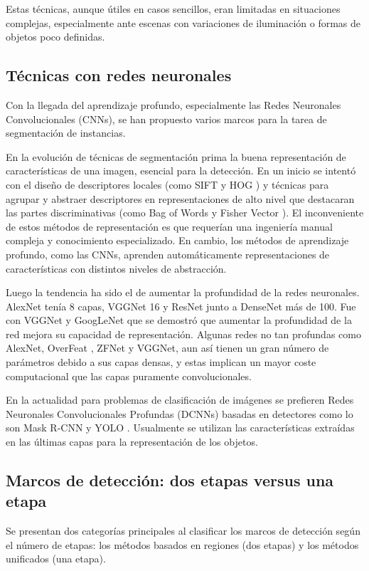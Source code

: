 Estas técnicas, aunque útiles en casos sencillos, eran limitadas en situaciones complejas, especialmente ante escenas con variaciones de iluminación o formas de objetos poco definidas.

\subsection{Técnicas con redes neuronales}
Con la llegada del aprendizaje profundo, especialmente las Redes Neuronales Convolucionales (CNNs), se han propuesto varios marcos para la tarea de segmentación de instancias.

En la evolución de técnicas de segmentación prima la buena representación de características de una imagen, esencial para la detección. En un inicio se intentó con el diseño de descriptores locales (como SIFT \cite{SIFT} y HOG \cite{HOG}) y técnicas para agrupar y abstraer descriptores en representaciones de alto nivel que destacaran las partes discriminativas (como Bag of Words \cite{BagOfWords} y Fisher Vector \cite{FisherVector}). El inconveniente de estos métodos de representación es que requerían una ingeniería manual compleja y conocimiento especializado. En cambio, los métodos de aprendizaje profundo, como las CNNs, aprenden automáticamente representaciones de características con distintos niveles de abstracción.

Luego la tendencia ha sido el de aumentar la profundidad de la redes neuronales. AlexNet \cite{AlexNet} tenía 8 capas, VGGNet \cite{VGGNet} 16 y ResNet \cite{ResNet} junto a DenseNet \cite{DenseNet} más de 100. Fue con VGGNet y GoogLeNet \cite{GoogleNet} que se demostró que aumentar la profundidad de la red mejora su capacidad de representación. Algunas redes no tan profundas como AlexNet, OverFeat \cite{OverFeat}, ZFNet \cite{ZFNet} y VGGNet, aun así tienen un gran número de parámetros debido a sus capas densas, y estas implican un mayor coste computacional que las capas puramente convolucionales.

En la actualidad para problemas de clasificación de imágenes se prefieren Redes Neuronales Convolucionales Profundas (DCNNs) basadas en detectores como lo son Mask R-CNN \cite{MaskRCNN} y YOLO \cite{YOLO}. Usualmente se utilizan las características extraídas en las últimas capas para la representación de los objetos.

\subsection{Marcos de detección: dos etapas versus una etapa}
\label{sec:anexo_marcos}
Se presentan dos categorías principales al clasificar los marcos de detección según el número de etapas: los métodos basados en regiones (dos etapas) y los métodos unificados (una etapa).

